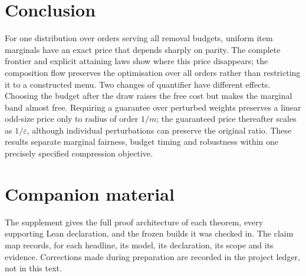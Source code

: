 \section{Conclusion}

For one distribution over orders serving all removal budgets, uniform item marginals have
an exact price that depends sharply on parity. The complete frontier and explicit attaining
laws show where this price disappears; the composition flow preserves the optimisation over
all orders rather than restricting it to a constructed menu. Two changes of quantifier have
different effects. Choosing the budget after the draw raises the free cost but makes the
marginal band almost free. Requiring a guarantee over perturbed weights preserves a linear
odd-size price only to radius of order $1/m$; the guaranteed price thereafter scales as
$1/\varepsilon$, although individual perturbations can preserve the original ratio.
These results separate marginal fairness, budget timing and robustness within one precisely
specified compression objective.

\section*{Companion material}
The supplement gives the full proof architecture of each theorem, every supporting Lean
declaration, and the frozen builds it was checked in. The claim map records, for each
headline, its model, its declaration, its scope and its evidence. Corrections made during
preparation are recorded in the project ledger, not in this text.


